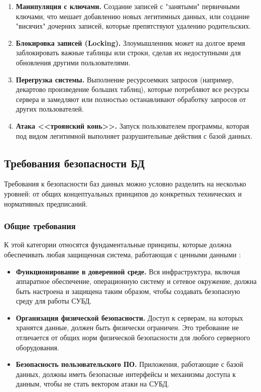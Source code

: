 \begin{itemize}
	\begin{enumerate}
		\item \textbf{Манипуляция с ключами.} Создание записей с "занятыми" первичными ключами, что мешает добавлению новых легитимных данных, или создание "висячих" дочерних записей, которые препятствуют удалению родительских.
		\item \textbf{Блокировка записей (Locking).} Злоумышленник может на долгое время заблокировать важные таблицы или строки, сделав их недоступными для обновления другими пользователями.
		\item \textbf{Перегрузка системы.} Выполнение ресурсоемких запросов (например, декартово произведение больших таблиц), которые потребляют все ресурсы сервера и замедляют или полностью останавливают обработку запросов от других пользователей.
		\item \textbf{Атака <<троянский конь>>.} Запуск пользователем программы, которая под видом легитимной выполняет разрушительные действия с базой данных.
	\end{enumerate}
\end{itemize}

\subsection{Требования безопасности БД}
Требования к безопасности баз данных можно условно разделить на несколько уровней: от общих концептуальных принципов до конкретных технических и нормативных предписаний. 

\subsubsection{Общие требования}
К этой категории относятся фундаментальные принципы, которые должна обеспечивать любая защищенная система, работающая с ценными данными \autocite{LAPA, Pirogov2009}:
\begin{itemize}
    \item \textbf{Функционирование в доверенной среде.} Вся инфраструктура, включая аппаратное обеспечение, операционную систему и сетевое окружение, должна быть настроена и защищена таким образом, чтобы создавать безопасную среду для работы СУБД.
    \item \textbf{Организация физической безопасности.} Доступ к серверам, на которых хранятся данные, должен быть физически ограничен. Это требование не отличается от общих норм физической безопасности для любого серверного оборудования.
    \item \textbf{Безопасность пользовательского ПО.} Приложения, работающие с базой данных, должны иметь безопасные интерфейсы и механизмы доступа к данным, чтобы не стать вектором атаки на СУБД.
\end{itemize}

